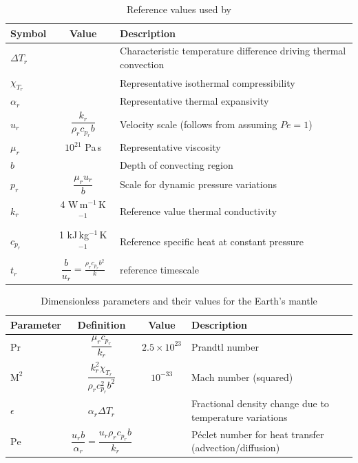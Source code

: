 \documentclass[document.tex]{subfiles}
\begin{document}
\begin{table}[ht]
    \centering
    \caption{Reference values used by \cite{scto01}}
    \label{schubert ref}
    \renewcommand{\arraystretch}{1.8}   %
    \setlength{\tabcolsep}{12pt}        %
    \begin{tabular}{lcl}
        \toprule
        Symbol & Value & Description \\
        \midrule
        $\Delta T_r$ & & Characteristic temperature difference driving thermal convection \\
        $\chi_{T_r}$ & & Representative isothermal compressibility \\
        $\alpha_r$ & & Representative thermal expansivity \\
        $u_r$ & $\dfrac{k_r}{\rho_r c_{p_r} b}$ & Velocity scale (follows from assuming $Pe = 1$) \\
        $\mu_r$ & $10^{21}$ Pa\,s & Representative viscosity \\
        $b$ & & Depth of convecting region \\
        $p_r$ & $\dfrac{\mu_r u_r}{b}$ & Scale for dynamic pressure variations \\
        $k_r$ & 4 W\,m$^{-1}$\,K$^{-1}$ & Reference value thermal conductivity \\
        $c_{p_r}$ & 1 kJ\,kg$^{-1}$\,K$^{-1}$ & Reference specific heat at constant pressure \\
        $t_r$ & $\dfrac{b}{u_r} = \frac{\rho_r c_{p_r} b^2}{k}$ & reference timescale \\ 
        \bottomrule
    \end{tabular}
\end{table}

\begin{table}[ht]
    \centering
    \caption{Dimensionless parameters and their values for the Earth's mantle}
    \label{dimensionless parameters schubert}
    \renewcommand{\arraystretch}{1.8}   %
    \setlength{\tabcolsep}{12pt}        %
    \begin{tabular}{lccl}
        \toprule
        Parameter & Definition & Value & Description \\
        \midrule
        $\mathrm{Pr}$ & $\dfrac{\mu_r c_{p_r}}{k_r}$ & $2.5 \times 10^{23}$ & Prandtl number \\
        $\mathrm{M}^2$ & $\dfrac{k_r^2 \chi_{T_r}}{\rho_r c_{p_r}^2 b^2}$ & $10^{-33}$ & Mach number (squared) \\
        $\epsilon$ & $\alpha_r \Delta T_r$ & & Fractional density change due to temperature variations \\
        $\mathrm{Pe}$ & $\dfrac{u_rb}{\alpha_r} = \dfrac{u_r\rho_r c_{p_r}b}{k_r}$ & &Péclet number for heat transfer (advection/diffusion) \\
        \bottomrule
    \end{tabular}
\end{table}
\end{document}
